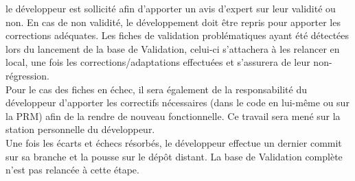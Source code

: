 le développeur est sollicité afin d'apporter un avis d'expert sur leur validité ou non.
En cas de non validité, le développement doit être repris pour apporter les corrections adéquates.
Les fiches de validation problématiques ayant été détectées lors du lancement de la base de Validation,
celui-ci s'attachera à les relancer en local, une fois les corrections/adaptations effectuées et s'assurera de leur non-régression.\\
Pour le cas des fiches en échec, il sera également de la responsabilité du développeur
d'apporter les correctifs nécessaires (dans le code en lui-même ou sur la PRM)
afin de la rendre de nouveau fonctionnelle. Ce travail sera mené sur la station personnelle du développeur.\\
Une fois les écarts et échecs résorbés,
le développeur effectue un dernier commit sur sa branche et la pousse sur le dépôt distant.
La base de Validation complète n'est pas relancée à cette étape.

